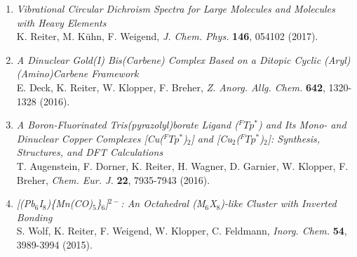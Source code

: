 \begin{enumerate}
\item \textit{Vibrational Circular Dichroism Spectra for Large Molecules and Molecules with Heavy Elements}\\
K. Reiter, M. Kühn, F. Weigend, \textit{J. Chem. Phys.} \textbf{146}, 054102 (2017).

\item \textit{A Dinuclear Gold(I) Bis(Carbene) Complex Based on a Ditopic Cyclic (Aryl)\\(Amino)Carbene Framework}\\
E. Deck, K. Reiter, W. Klopper, F. Breher, \textit{Z. Anorg. Allg. Chem.} \textbf{642}, 1320-1328 (2016).

\item \textit{A Boron-Fluorinated Tris(pyrazolyl)borate Ligand ($^FTp^*$) and Its Mono- and Dinuclear Copper Complexes [Cu($^FTp^*$)$_2$] and [Cu$_2$($^FTp^*$)$_2$]: Synthesis, Structures, and DFT Calculations}\\
T. Augenstein, F. Dorner, K. Reiter, H. Wagner, D. Garnier, W. Klopper, F. Breher, \textit{Chem. Eur. J.} \textbf{22}, 7935-7943 (2016).

\item \textit{[(Pb$_6$I$_8$)\{Mn(CO)$_5$\}$_6$]$^{2-}$: An Octahedral (M$_6$X$_8$)-like Cluster with Inverted Bonding}\\
S. Wolf, K. Reiter, F. Weigend, W. Klopper, C. Feldmann, \textit{Inorg. Chem.} \textbf{54}, 3989-3994 (2015).
\end{enumerate}